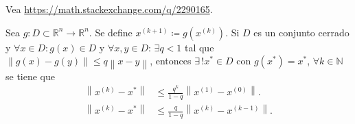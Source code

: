 \begin{solutionordottedlines}
	Vea \url{https://math.stackexchange.com/q/2290165}.
\end{solutionordottedlines}

\question

Sea $g\colon D\subset\mathbb{R}^{n}\to\mathbb{R}^{n}$.
Se define $x^{\left(k+1\right)}\coloneqq g\left(x^{\left(k\right)}\right)$.
Si $D$ es un conjunto cerrado y $\forall x\in D: g\left(x\right)\in D$ y
$\forall x,y\in D$: $\exists q<1$ tal que $\left\|g\left(x\right)-g\left(y\right)\right\|\leq q\left\|x-y\right\|$,
entonces $\exists\,! x^{\ast}\in D$ con $g\left(x^{\ast}\right)=x^{\ast}$, $\forall k\in\mathbb{N}$ se tiene que
\begin{align}
	\left\|x^{\left(k\right)}-x^{\ast}\right\| & \leq
	\frac{q^{k}}{1-q}
	\left\|x^{\left(1\right)}-x^{\left(0\right)}\right\|.\tag{Estimación de error a priori} \\
	\left\|x^{\left(k\right)}-x^{\ast}\right\| & \leq
	\frac{q}{1-q}
	\left\|x^{\left(k\right)}-x^{\left(k-1\right)}\right\|.\tag{Estimación de error a posteriori}
\end{align}
